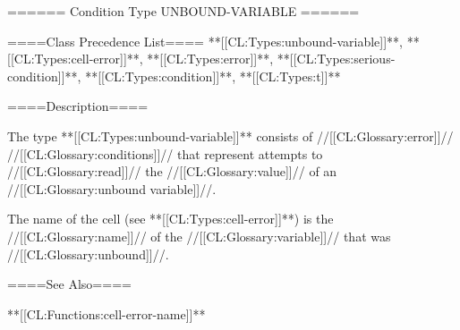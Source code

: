 ====== Condition Type UNBOUND-VARIABLE ======

====Class Precedence List==== **[[CL:Types:unbound-variable]]**, **[[CL:Types:cell-error]]**, **[[CL:Types:error]]**, **[[CL:Types:serious-condition]]**, **[[CL:Types:condition]]**, **[[CL:Types:t]]**

====Description====

The type **[[CL:Types:unbound-variable]]** consists of //[[CL:Glossary:error]]// //[[CL:Glossary:conditions]]// that represent attempts to //[[CL:Glossary:read]]// the //[[CL:Glossary:value]]// of an //[[CL:Glossary:unbound variable]]//.

The name of the cell (see **[[CL:Types:cell-error]]**) is the //[[CL:Glossary:name]]// of the //[[CL:Glossary:variable]]// that was //[[CL:Glossary:unbound]]//.

====See Also====

**[[CL:Functions:cell-error-name]]**

